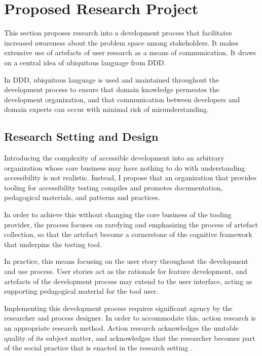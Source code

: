 \section{Proposed Research Project} %
\label{sec:proposed_development_process}

This section proposes research into a development process that facilitates increased awareness about the problem space among stakeholders. It makes extensive use of artefacts of user research as a means of communication. It draws on a central idea of ubiquitous language from \ac{DDD}.

In \ac{DDD}, ubiquitous language is used and maintained throughout the development process to ensure that domain knowledge permeates the development organization, and that communication between developers and domain experts can occur with minimal risk of misunderstanding. 

\subsection{Research Setting and Design} %
\label{sub:research_setting}

Introducing the complexity of accessible development into an arbitrary organization whose core business may have nothing to do with understanding accessibility is not realistic. Instead, I propose that an organization that provides tooling for accessibility testing compiles and promotes documentation, pedagogical materials, and patterns and practices.

In order to achieve this without changing the core business of the tooling provider, the process focuses on rarefying and emphasizing the process of artefact collection, so that the artefact become a cornerstone of the cognitive framework that underpins the testing tool. 

In practice, this means focusing on the user story throughout the development and use process. User stories act as the rationale for feature development, and artefacts of the development process may extend to the user interface, acting as supporting pedagogical material for the tool user.

Implementing this development process requires significant agency by the researcher and process designer. In order to accommodate this, action research is an appropriate research method. Action research acknowledges the mutable quality of its subject matter, and acknowledges that the researcher becomes part of the social practice that is enacted in the research setting \cite{Checkland:1998}.

